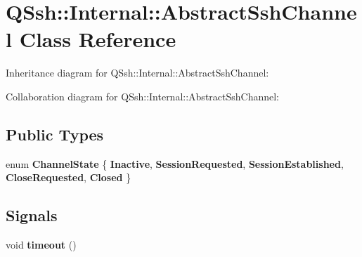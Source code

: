\hypertarget{class_q_ssh_1_1_internal_1_1_abstract_ssh_channel}{}\section{Q\+Ssh\+:\+:Internal\+:\+:Abstract\+Ssh\+Channel Class Reference}
\label{class_q_ssh_1_1_internal_1_1_abstract_ssh_channel}


Inheritance diagram for Q\+Ssh\+:\+:Internal\+:\+:Abstract\+Ssh\+Channel\+:


Collaboration diagram for Q\+Ssh\+:\+:Internal\+:\+:Abstract\+Ssh\+Channel\+:
\subsection*{Public Types}
\begin{DoxyCompactItemize}
\item 
\mbox{\label{class_q_ssh_1_1_internal_1_1_abstract_ssh_channel_a7b7408679d5f0d899aa725897704db17}} 
enum {\bfseries Channel\+State} \{ \newline
{\bfseries Inactive}, 
{\bfseries Session\+Requested}, 
{\bfseries Session\+Established}, 
{\bfseries Close\+Requested}, 
\newline
{\bfseries Closed}
 \}
\end{DoxyCompactItemize}
\subsection*{Signals}
\begin{DoxyCompactItemize}
\item 
\mbox{\label{class_q_ssh_1_1_internal_1_1_abstract_ssh_channel_a737e759392d98a4b4a085e57fe7c5884}} 
void {\bfseries timeout} ()
\end{DoxyCompactItemize}
